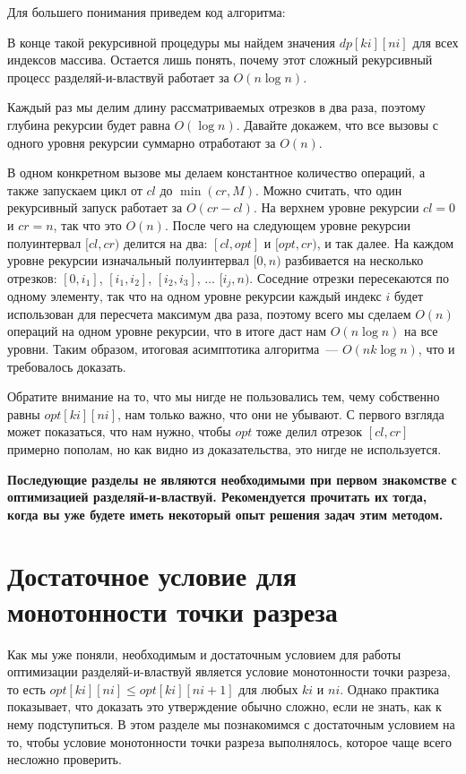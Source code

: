 Для большего понимания приведем код алгоритма:



В конце такой рекурсивной процедуры мы найдем значения $dp[ki][ni]$ для всех индексов массива. Остается лишь понять, почему этот сложный рекурсивный процесс разделяй-и-властвуй работает за $O(n \log n)$.

Каждый раз мы делим длину рассматриваемых отрезков в два раза, поэтому глубина рекурсии будет равна $O(\log n)$. Давайте докажем, что все вызовы с одного уровня рекурсии суммарно отработают за $O(n)$.

В одном конкретном вызове мы делаем константное количество операций, а также запускаем цикл от $cl$ до $\min(cr, M)$. Можно считать, что один рекурсивный запуск работает за $O(cr - cl)$. На верхнем уровне рекурсии $cl = 0$ и $cr = n$, так что это $O(n)$. После чего на следующем уровне рекурсии полуинтервал $[cl, cr)$ делится на два: $[cl, opt]$ и $[opt, cr)$, и так далее. На каждом уровне рекурсии изначальный полуинтервал $[0, n)$ разбивается на несколько отрезков: $[0, i_1]$, $[i_1, i_2]$, $[i_2, i_3]$, $\ldots$ $[i_j, n)$. Соседние отрезки пересекаются по одному элементу, так что на одном уровне рекурсии каждый индекс $i$ будет использован для пересчета максимум два раза, поэтому всего мы сделаем $O(n)$ операций на одном уровне рекурсии, что в итоге даст нам $O(n \log n)$ на все уровни. Таким образом, итоговая асимптотика алгоритма~--- $O(n k \log n)$, что и требовалось доказать.

\begin{observation}
    Обратите внимание на то, что мы нигде не пользовались тем, чему собственно равны $opt[ki][ni]$, нам только важно, что они не убывают. С первого взгляда может показаться, что нам нужно, чтобы $opt$ тоже делил отрезок $[cl, cr]$ примерно пополам, но как видно из доказательства, это нигде не используется.
\end{observation}

\textbf{Последующие разделы не являются необходимыми при первом знакомстве с оптимизацией разделяй-и-властвуй. Рекомендуется прочитать их тогда, когда вы уже будете иметь некоторый опыт решения задач этим методом.}

\section{Достаточное условие для монотонности точки разреза}

Как мы уже поняли, необходимым и достаточным условием для работы оптимизации разделяй-и-властвуй является условие монотонности точки разреза, то есть $opt[ki][ni] \le opt[ki][ni + 1]$ для любых $ki$ и $ni$. Однако практика показывает, что доказать это утверждение обычно сложно, если не знать, как к нему подступиться. В этом разделе мы познакомимся с достаточным условием на то, чтобы условие монотонности точки разреза выполнялось, которое чаще всего несложно проверить.

